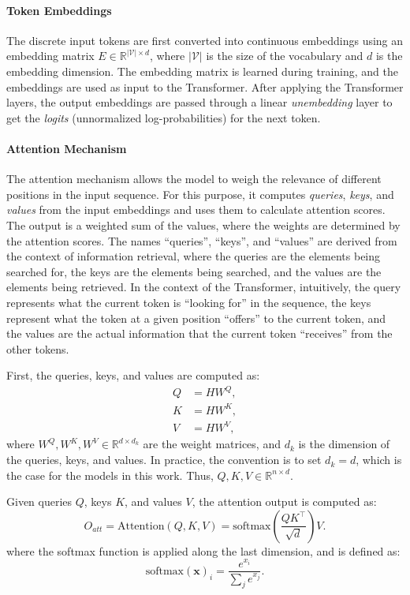 \paragraph{Token Embeddings}
The discrete input tokens are first converted into continuous embeddings using an embedding matrix $E \in \mathbb{R}^{|\mathcal{V}| \times d}$, where $|\mathcal{V}|$ is the size of the vocabulary and $d$ is the embedding dimension. The embedding matrix is learned during training, and the embeddings are used as input to the Transformer. After applying the Transformer layers, the output embeddings are passed through a linear \emph{unembedding} layer to get the \emph{logits} (unnormalized log-probabilities) for the next token.

\paragraph{Attention Mechanism}
The attention mechanism \parencite{bahdanau_neural_2014} allows the model to weigh the relevance of different positions in the input sequence. For this purpose, it computes \emph{queries}, \emph{keys}, and \emph{values} from the input embeddings and uses them to calculate attention scores. The output is a weighted sum of the values, where the weights are determined by the attention scores. The names ``queries'', ``keys'', and ``values'' are derived from the context of information retrieval, where the queries are the elements being searched for, the keys are the elements being searched, and the values are the elements being retrieved. In the context of the Transformer, intuitively, the query represents what the current token is ``looking for'' in the sequence, the keys represent what the token at a given position ``offers'' to the current token, and the values are the actual information that the current token ``receives'' from the other tokens.

First, the queries, keys, and values are computed as:
\begin{align*}
    Q & = H W^Q, \\
    K & = H W^K, \\
    V & = H W^V,
\end{align*}
where $W^Q, W^K, W^V \in \mathbb{R}^{d \times d_k}$ are the weight matrices, and $d_k$ is the dimension of the queries, keys, and values. In practice, the convention is to set $d_k = d$, which is the case for the models in this work. Thus, $Q, K, V \in \mathbb{R}^{n \times d}$.

Given queries $Q$, keys $K$, and values $V$, the attention output is computed as:
\begin{equation*}
    O_{att} = \text{Attention}(Q, K, V) = \text{softmax}\left( \frac{Q K^\top}{\sqrt{d}} \right) V.
\end{equation*}
where the softmax function is applied along the last dimension, and is defined as:
\begin{equation*}
    \text{softmax}(\mathbf{x})_i = \frac{e^{x_i}}{\sum_j e^{x_j}}.
\end{equation*}

